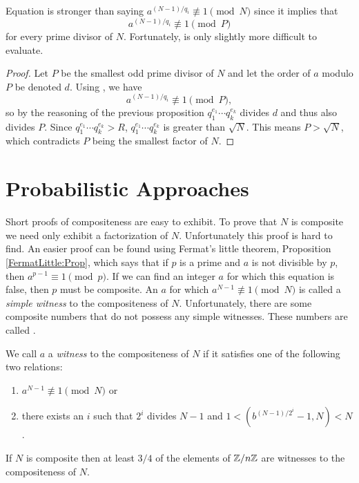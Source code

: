 Equation  is stronger than saying
$a^{(N-1)/q_i} \not\equiv 1 \pmod{N}$ since it implies that 
\[
a^{(N-1)/q_i} \not\equiv 1 \pmod{P}
\]
for every prime divisor of $N$.  Fortunately, 
is only slightly more difficult to evaluate.

\begin{proof}
Let $P$ be the smallest odd prime divisor of $N$ and let the order of
$a$ modulo $P$ be denoted $d$.  Using , we
have
\[
a^{(N-1)/q_i} \not\equiv 1 \pmod{P},
\]
so by the reasoning of the previous proposition $q_1^{e_1} \cdots
q_k^{e_k}$ divides $d$ and thus also divides $P$.  Since $q_1^{e_1}
\cdots q_k^{e_k} > R$, $q_1^{e_1} \cdots q_k^{e_k}$ is greater than
$\sqrt{N}$.  This means $P > \sqrt{N}$, which contradicts $P$ being
the smallest factor of $N$.
\end{proof}

\section{Probabilistic Approaches}

Short proofs of compositeness are easy to exhibit.  To prove that $N$ is
composite we need only exhibit a factorization of $N$.  Unfortunately this
proof is hard to find.  An easier proof can be found using Fermat's little
theorem, Proposition \ref{FermatLittle:Prop}, which says that if $p$ is a
prime and $a$ is not divisible by $p$, then $a^{p-1} \equiv 1 \pmod{p}$.
If we can find an integer $a$ for which this equation is false, then $p$
must be composite.  An $a$ for which $a^{N-1} \not\equiv 1\pmod{N}$ is
called a {\em simple witness} to the compositeness of $N$.
Unfortunately, there are some composite numbers that do not possess any
simple witnesses.  These numbers are called
.

We call $a$ a {\em witness} to the compositeness of $N$ if it satisfies one
of the following two relations: 
\begin{enumerate}
\item $a^{N-1} \not\equiv 1 \pmod{N}$ or 
\item there exists an $i$ such that $2^i$ divides $N-1$ and $1 <
(b^{(N-1)/2^i} - 1, N) < N$.
\end{enumerate}

\begin{proposition} \label{PrimeWitness:Prop}
If $N$ is composite then at least $3/4$
of the elements of $\mathbb{Z}/n\mathbb{Z}$ are witnesses to the compositeness of $N$.
\end{proposition}

